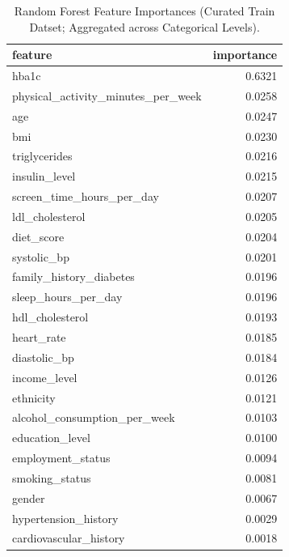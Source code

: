 \begin{table}[H]
\begin{center}
\begin{tabular}{lr}
\toprule
feature & importance \\
\midrule
hba1c & 0.6321 \\
physical\_activity\_minutes\_per\_week & 0.0258 \\
age & 0.0247 \\
bmi & 0.0230 \\
triglycerides & 0.0216 \\
insulin\_level & 0.0215 \\
screen\_time\_hours\_per\_day & 0.0207 \\
ldl\_cholesterol & 0.0205 \\
diet\_score & 0.0204 \\
systolic\_bp & 0.0201 \\
family\_history\_diabetes & 0.0196 \\
sleep\_hours\_per\_day & 0.0196 \\
hdl\_cholesterol & 0.0193 \\
heart\_rate & 0.0185 \\
diastolic\_bp & 0.0184 \\
income\_level & 0.0126 \\
ethnicity & 0.0121 \\
alcohol\_consumption\_per\_week & 0.0103 \\
education\_level & 0.0100 \\
employment\_status & 0.0094 \\
smoking\_status & 0.0081 \\
gender & 0.0067 \\
hypertension\_history & 0.0029 \\
cardiovascular\_history & 0.0018 \\
\bottomrule
\end{tabular}
\end{center}
\vspace{-5pt}
\caption{Random Forest Feature Importances (Curated Train Datset; Aggregated across Categorical Levels).}
\label{tab:rf_importance_agg}
\end{table}
